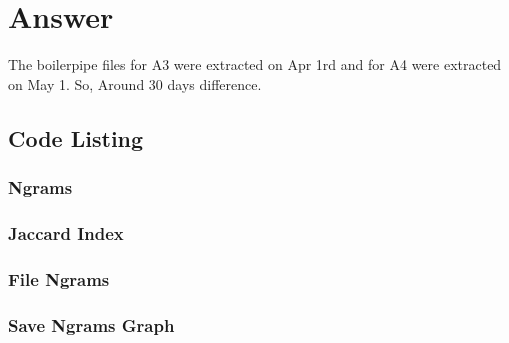 \documentclass{article}
\begin{document}
\section{Answer}

The boilerpipe files for A3 were extracted on Apr 1rd and for A4 were extracted on May 1. So, Around 30 days difference.\


\clearpage

\subsection{Code Listing}
\subsubsection{Ngrams}



\subsubsection{Jaccard Index}


\newpage

\subsubsection{File Ngrams}



\subsubsection{Save Ngrams Graph}
\end{document}
